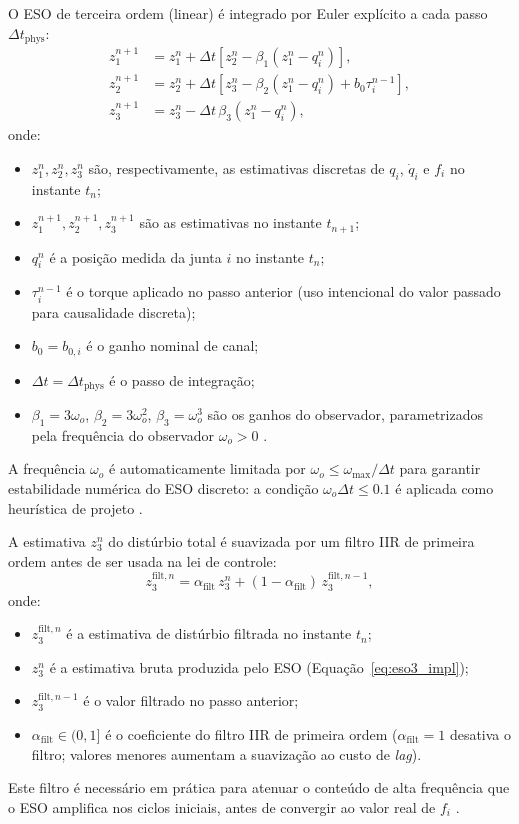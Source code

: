 O ESO de terceira ordem (linear) é integrado por Euler explícito a cada passo $\Delta t_{\text{phys}}$:
\begin{align}
    z_1^{n+1} &= z_1^n + \Delta t\left[z_2^n - \beta_1(z_1^n - q_i^n)\right], \label{eq:eso1_impl}\\
    z_2^{n+1} &= z_2^n + \Delta t\left[z_3^n - \beta_2(z_1^n - q_i^n) + b_0 \tau_i^{n-1}\right], \label{eq:eso2_impl}\\
    z_3^{n+1} &= z_3^n - \Delta t\,\beta_3(z_1^n - q_i^n), \label{eq:eso3_impl}
\end{align}
onde:
\begin{itemize}
    \item $z_1^n, z_2^n, z_3^n$ são, respectivamente, as estimativas discretas de $q_i$, $\dot{q}_i$ e $f_i$ no instante $t_n$;
    \item $z_1^{n+1}, z_2^{n+1}, z_3^{n+1}$ são as estimativas no instante $t_{n+1}$;
    \item $q_i^n$ é a posição medida da junta $i$ no instante $t_n$;
    \item $\tau_i^{n-1}$ é o torque aplicado no passo anterior (uso intencional do valor passado para causalidade discreta);
    \item $b_0 = b_{0,i}$ é o ganho nominal de canal;
    \item $\Delta t = \Delta t_{\text{phys}}$ é o passo de integração;
    \item $\beta_1 = 3\omega_o$, $\beta_2 = 3\omega_o^2$, $\beta_3 = \omega_o^3$ são os ganhos do observador, parametrizados pela frequência do observador $\omega_o > 0$ \cite{gao2003scaling}.
\end{itemize} A frequência $\omega_o$ é automaticamente limitada por $\omega_o \leq \omega_{\max}/\Delta t$ para garantir estabilidade numérica do ESO discreto: a condição $\omega_o \Delta t \leq 0.1$ é aplicada como heurística de projeto \cite{zheng2010practical}.

A estimativa $z_3^n$ do distúrbio total é suavizada por um filtro IIR de primeira ordem antes de ser usada na lei de controle:
\begin{equation}
    z_3^{\text{filt},n} = \alpha_{\text{filt}}\,z_3^n + (1 - \alpha_{\text{filt}})\,z_3^{\text{filt},n-1},
    \label{eq:z3_filter}
\end{equation}
onde:
\begin{itemize}
    \item $z_3^{\text{filt},n}$ é a estimativa de distúrbio filtrada no instante $t_n$;
    \item $z_3^n$ é a estimativa bruta produzida pelo ESO (Equação~\eqref{eq:eso3_impl});
    \item $z_3^{\text{filt},n-1}$ é o valor filtrado no passo anterior;
    \item $\alpha_{\text{filt}} \in (0, 1]$ é o coeficiente do filtro IIR de primeira ordem ($\alpha_{\text{filt}} = 1$ desativa o filtro; valores menores aumentam a suavização ao custo de \textit{lag}).
\end{itemize} Este filtro é necessário em prática para atenuar o conteúdo de alta frequência que o ESO amplifica nos ciclos iniciais, antes de convergir ao valor real de $f_i$ \cite{han2009pid}.

